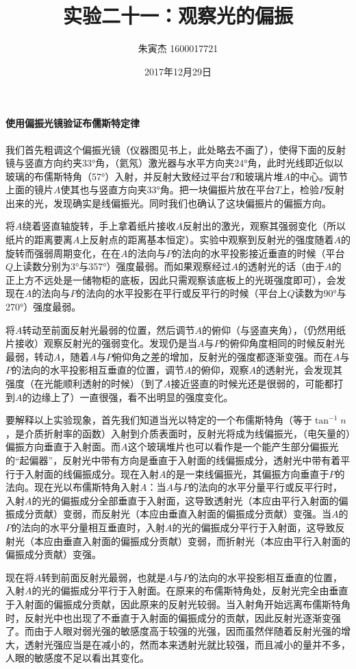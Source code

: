 \documentclass[UTF8]{ctexart}
\title{实验二十一：观察光的偏振}
\author{朱寅杰 1600017721}
\date{2017年12月29日}
\begin{document}
\maketitle
\paragraph{使用偏振光镜验证布儒斯特定律}
我们首先粗调这个偏振光镜（仪器图见书上，此处略去不画了），使得下面的反射镜与竖直方向约夹\ang{33}角，（氦氖）激光器与水平方向夹\ang{24}角，此时光线即近似以玻璃的布儒斯特角（\ang{57}）入射，并反射大致经过平台$T$和玻璃片堆$A$的中心。调节上面的镜片$A$使其也与竖直方向夹\ang{33}角。把一块偏振片放在平台$T$上，检验$P$反射出来的光，发现确实是线偏振光。同时我们也确认了这块偏振片的偏振方向。

将$A$绕着竖直轴旋转，手上拿着纸片接收$A$反射出的激光，观察其强弱变化（所以纸片的距离要离$A$上反射点的距离基本恒定）。实验中观察到反射光的强度随着$A$的旋转而强弱周期变化，在在$A$的法向与$P$的法向的水平投影接近垂直的时候（平台$Q$上读数分别为\ang{3}与\ang{357}）强度最弱。而如果观察经过$A$的透射光的话（由于$A$的正上方不远处是一储物柜的底板，因此只需观察该底板上的光斑强度即可），会发现在$A$的法向与$P$的法向的水平投影在平行或反平行的时候（平台上$Q$读数为\ang{90}与\ang{270}）强度最弱。

将$A$转动至前面反射光最弱的位置，然后调节$A$的俯仰（与竖直夹角），（仍然用纸片接收）观察反射光的强弱变化。发现仍是当$A$与$P$的俯仰角度相同的时候反射光最弱，转动$A$，随着$A$与$P$俯仰角之差的增加，反射光的强度都逐渐变强。而在$A$与$P$的法向的水平投影相互垂直的位置，调节$A$的俯仰，观察$A$的透射光，会发现其强度（在光能顺利透射的时候）（到了$A$接近竖直的时候光还是很弱的，可能都打到$A$的边缘上了）一直很强，看不出明显的强度变化。

要解释以上实验现象，首先我们知道当光以特定的一个布儒斯特角（等于$\tan^{-1}n$，是介质折射率的函数）入射到介质表面时，反射光将成为线偏振光，（电矢量的）偏振方向垂直于入射面。而$A$这个玻璃堆片也可以看作是一个能产生部分偏振光的“起偏器”，反射光中带有方向是垂直于入射面的线偏振成分，透射光中带有着平行于入射面的线偏振成分。现在入射$A$的是一束线偏振光，其偏振方向垂直于$P$的法向。现在光以布儒斯特角入射$A$：当$A$与$P$的法向的水平分量平行或反平行时，入射$A$的光的偏振成分全部垂直于入射面，这导致透射光（本应由平行入射面的偏振成分贡献）变弱，而反射光（本应由垂直入射面的偏振成分贡献）变强。当$A$的$P$的法向的水平分量相互垂直时，入射$A$的光的偏振成分平行于入射面，这导致反射光（本应由垂直入射面的偏振成分贡献）变弱，而折射光（本应由平行入射面的偏振成分贡献）变强。

现在将$A$转到前面反射光最弱，也就是$A$与$P$的法向的水平投影相互垂直的位置，入射$A$的光的偏振成分平行于入射面。在原来的布儒斯特角处，反射光完全由垂直于入射面的偏振成分贡献，因此原来的反射光较弱。当入射角开始远离布儒斯特角时，反射光中也出现了不垂直于入射面的偏振成分的贡献，因此反射光逐渐变强了。而由于人眼对弱光强的敏感度高于较强的光强，因而虽然伴随着反射光强的增大，透射光强应当是在减小的，然而本来透射光就比较强，而且减小的量并不多，人眼的敏感度不足以看出其变化。
\end{document}
